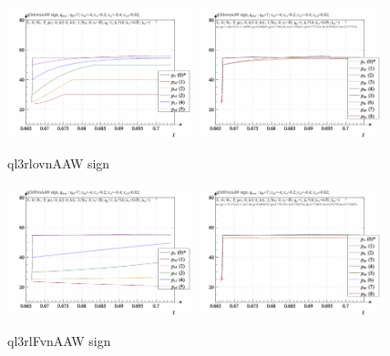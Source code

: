 \documentclass[a4paper,10pt]{article}
\begin{document}



\begin{figure}[htb!]
  \centerline{
    \includegraphics[width=0.48\textwidth]{qls-p_t_pi_m_ql3rlovnAAW_sign.png}
    \hfill
    \includegraphics[width=0.48\textwidth]{qls-p_t_p_m_ql3rlovnAAW_sign.png}
  }
  \caption{ql3rlovnAAW sign}
  \label{atu:fig5}
\end{figure}

\begin{figure}[htb!]
  \centerline{
    \includegraphics[width=0.48\textwidth]{qls-p_t_pi_m_ql3rlFvnAAW_sign.png}
    \hfill
    \includegraphics[width=0.48\textwidth]{qls-p_t_p_m_ql3rlFvnAAW_sign.png}
  }
  \caption{ql3rlFvnAAW sign}
  \label{atu:fig6}
\end{figure}
\end{document}
